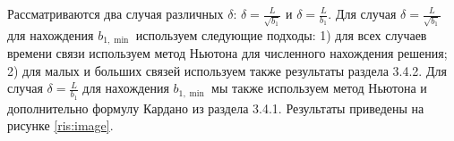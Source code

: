 \documentclass{article}
\theoremstyle{definition}
\theoremstyle{plain}
\begin{document}
Рассматриваются два случая различных $\delta$: $\delta = \frac{L}{\sqrt{b_1}}$ и $\delta = \frac{L}{b_1}$. Для случая $\delta = \frac{L}{\sqrt{b_1}}$ для нахождения $b_{1, \min}$ используем следующие подходы: 1) для всех случаев времени связи используем метод Ньютона для численного нахождения решения; 2) для малых и больших связей используем также результаты раздела 3.4.2. Для случая $\delta = \frac{L}{b_1}$ для нахождения $b_{1, \min}$ мы также используем метод Ньютона и дополнительно формулу Кардано из раздела 3.4.1. Результаты приведены на рисунке \ref{ris:image}.



\end{document}
